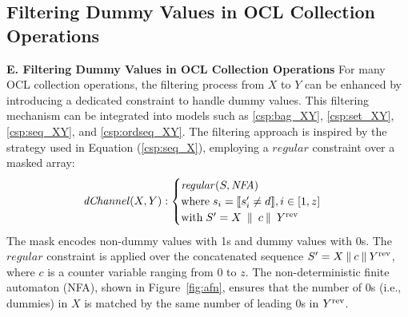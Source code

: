 
\subsection{Filtering Dummy Values in OCL Collection Operations}
\smallskip
\noindent 
\label{ssec:as_0}
\textbf{E. Filtering Dummy Values in OCL Collection Operations}
For many OCL collection operations, the filtering process from $X$ to $Y$ can be enhanced by introducing a dedicated constraint to handle dummy values. This filtering mechanism can be integrated into models such as \ref{csp:bag_XY}, \ref{csp:set_XY}, \ref{csp:seq_XY}, and \ref{csp:ordseq_XY}.
The filtering approach is inspired by the strategy used in Equation (\ref{csp:seq_X}), employing a $\mathit{regular}$ constraint over a masked array:
\begin{equation}\label{csp:as_0}
\mathit{dChannel}(X,Y) :
\begin{cases}
\mathit{regular}(S,\mathit{NFA})\\
\text{where}\; s_i=\llbracket s'_i\neq d\rrbracket, i \in [1,z]\\
\text{with} \; S' = X\;\mathbin{\|}\;c\mathbin{\|}\;Y^{\text{rev}} \\
\end{cases}
\end{equation}
The mask encodes non-dummy values with 1s and dummy values with 0s. 
The $\mathit{regular}$ constraint is applied over the concatenated sequence $S' = X\mathbin{\|}c\mathbin{\|}Y^{\text{rev}}$, where $c$ is a counter variable ranging from 0 to $z$. The non-deterministic finite automaton (NFA), shown in Figure~\ref{fig:afn}, ensures that the number of 0s (i.e., dummies) in $X$ is matched by the same number of leading 0s in $Y^{\text{rev}}$.

